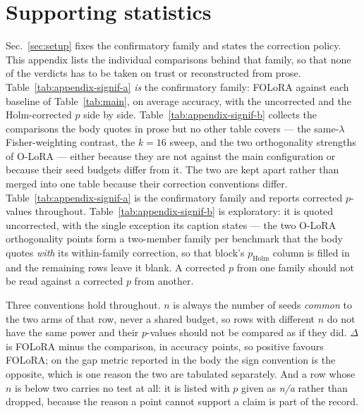 \appendix
\setcounter{figure}{0}

\section{Supporting statistics}
\label{app:significance}

Sec.~\ref{sec:setup} fixes the confirmatory family and states the correction policy. This
appendix lists the individual comparisons behind that family, so that none of the verdicts
has to be taken on trust or reconstructed from prose.
Table~\ref{tab:appendix-signif-a} \emph{is} the confirmatory family: FOLoRA against each
baseline of Table~\ref{tab:main}, on average accuracy, with the uncorrected and the
Holm-corrected $p$ side by side. Table~\ref{tab:appendix-signif-b} collects the
comparisons the body quotes in prose but no other table covers --- the same-$\lambda$
Fisher-weighting contrast, the $k{=}16$ sweep, and the two orthogonality strengths of
O-LoRA --- either because they are not against the main configuration or because their
seed budgets differ from it. The two are kept apart rather than merged into one table
because their correction conventions differ. Table~\ref{tab:appendix-signif-a} is the
confirmatory family and reports corrected $p$-values throughout.
Table~\ref{tab:appendix-signif-b} is exploratory: it is quoted uncorrected, with the single
exception its caption states --- the two O-LoRA orthogonality points form a two-member
family per benchmark that the body quotes \emph{with} its within-family correction, so that
block's $p_{\mathrm{Holm}}$ column is filled in and the remaining rows leave it blank.
A corrected $p$ from one family should not be read against a corrected $p$ from another.

Three conventions hold throughout. $n$ is always the number of seeds
\emph{common} to the two arms of that row, never a shared budget, so rows with different
$n$ do not have the same power and their $p$-values should not be compared as if they did.
$\Delta$ is FOLoRA minus the comparison, in accuracy points, so positive favours FOLoRA;
on the gap metric reported in the body the sign convention is the opposite, which is one
reason the two are tabulated separately. And a row whose $n$ is below two carries no test
at all: it is listed with $p$ given as \emph{n/a} rather than dropped, because the reason
a point cannot support a claim is part of the record.


